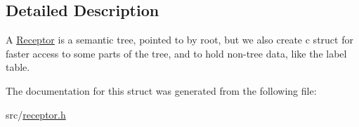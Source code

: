 \subsection{Detailed Description}
A \hyperlink{structReceptor}{Receptor} is a semantic tree, pointed to by root, but we also create c struct for faster access to some parts of the tree, and to hold non-\/tree data, like the label table. 

The documentation for this struct was generated from the following file\+:\begin{DoxyCompactItemize}
\item 
src/\hyperlink{receptor_8h}{receptor.\+h}\end{DoxyCompactItemize}
